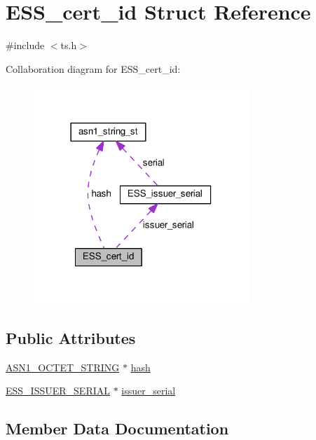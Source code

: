 \hypertarget{struct_e_s_s__cert__id}{}\section{E\+S\+S\+\_\+cert\+\_\+id Struct Reference}
\label{struct_e_s_s__cert__id}


{\ttfamily \#include $<$ts.\+h$>$}



Collaboration diagram for E\+S\+S\+\_\+cert\+\_\+id\+:
\nopagebreak
\begin{figure}[H]
\begin{center}
\leavevmode
\includegraphics[width=230pt]{struct_e_s_s__cert__id__coll__graph}
\end{center}
\end{figure}
\subsection*{Public Attributes}
\begin{DoxyCompactItemize}
\item 
\hyperlink{ossl__typ_8h_afbd05e94e0f0430a2b729473efec88c1}{A\+S\+N1\+\_\+\+O\+C\+T\+E\+T\+\_\+\+S\+T\+R\+I\+NG} $\ast$ \hyperlink{struct_e_s_s__cert__id_a54fc1707932a1ce31d87b48a86bdb22a}{hash}
\item 
\hyperlink{ts_8h_a9006b3b8a052856402cfac66160241e2}{E\+S\+S\+\_\+\+I\+S\+S\+U\+E\+R\+\_\+\+S\+E\+R\+I\+AL} $\ast$ \hyperlink{struct_e_s_s__cert__id_a17dc9c926a3f936f0a9417486d7a55c9}{issuer\+\_\+serial}
\end{DoxyCompactItemize}


\subsection{Member Data Documentation}
